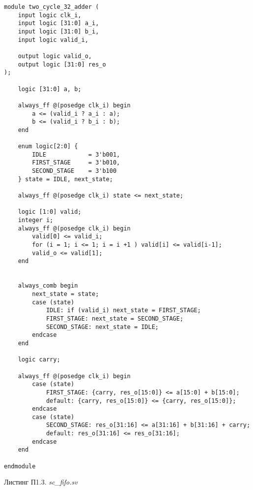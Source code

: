 \begin{lstlisting}
module two_cycle_32_adder (
    input logic clk_i,
    input logic [31:0] a_i,
    input logic [31:0] b_i,
    input logic valid_i,

    output logic valid_o,
    output logic [31:0] res_o
);
    
    logic [31:0] a, b;

    always_ff @(posedge clk_i) begin
        a <= (valid_i ? a_i : a);
        b <= (valid_i ? b_i : b);
    end

    enum logic[2:0] {
        IDLE            = 3'b001, 
        FIRST_STAGE     = 3'b010, 
        SECOND_STAGE    = 3'b100
    } state = IDLE, next_state;

    always_ff @(posedge clk_i) state <= next_state;
  
    logic [1:0] valid;
    integer i;
    always_ff @(posedge clk_i) begin
        valid[0] <= valid_i;
        for (i = 1; i <= 1; i = i +1 ) valid[i] <= valid[i-1];
        valid_o <= valid[1];
    end


    always_comb begin
        next_state = state;
        case (state)
            IDLE: if (valid_i) next_state = FIRST_STAGE;
            FIRST_STAGE: next_state = SECOND_STAGE;
            SECOND_STAGE: next_state = IDLE;
        endcase
    end

    logic carry;

    always_ff @(posedge clk_i) begin
        case (state) 
            FIRST_STAGE: {carry, res_o[15:0]} <= a[15:0] + b[15:0];
            default: {carry, res_o[15:0]} <= {carry, res_o[15:0]};
        endcase
        case (state)
            SECOND_STAGE: res_o[31:16] <= a[31:16] + b[31:16] + carry;
            default: res_o[31:16] <= res_o[31:16];
        endcase
    end

endmodule
\end{lstlisting}

\begin{flushright}
Листинг П1.3. \emph{sc\_fifo.sv}
\end{flushright}

